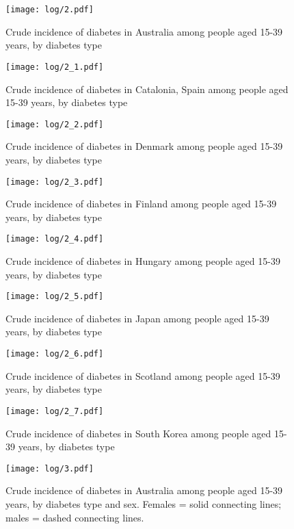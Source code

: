 \documentclass[11pt]{article}
\begin{document}
\color{Blue4}
\begin{figure}
    \centering
    \texttt{[image: log/2.pdf]}
    \caption{Crude incidence of diabetes in Australia among people aged 15-39 years, by diabetes type}
    \label{Australiacrude}
\end{figure}
\begin{figure}
    \centering
    \texttt{[image: log/2\_1.pdf]}
    \caption{Crude incidence of diabetes in Catalonia, Spain among people aged 15-39 years, by diabetes type}
    \label{Catalonia, Spaincrude}
\end{figure}
\begin{figure}
    \centering
    \texttt{[image: log/2\_2.pdf]}
    \caption{Crude incidence of diabetes in Denmark among people aged 15-39 years, by diabetes type}
    \label{Denmarkcrude}
\end{figure}
\begin{figure}
    \centering
    \texttt{[image: log/2\_3.pdf]}
    \caption{Crude incidence of diabetes in Finland among people aged 15-39 years, by diabetes type}
    \label{Finlandcrude}
\end{figure}
\begin{figure}
    \centering
    \texttt{[image: log/2\_4.pdf]}
    \caption{Crude incidence of diabetes in Hungary among people aged 15-39 years, by diabetes type}
    \label{Hungarycrude}
\end{figure}
\begin{figure}
    \centering
    \texttt{[image: log/2\_5.pdf]}
    \caption{Crude incidence of diabetes in Japan among people aged 15-39 years, by diabetes type}
    \label{Japancrude}
\end{figure}
\begin{figure}
    \centering
    \texttt{[image: log/2\_6.pdf]}
    \caption{Crude incidence of diabetes in Scotland among people aged 15-39 years, by diabetes type}
    \label{Scotlandcrude}
\end{figure}
\begin{figure}
    \centering
    \texttt{[image: log/2\_7.pdf]}
    \caption{Crude incidence of diabetes in South Korea among people aged 15-39 years, by diabetes type}
    \label{South Koreacrude}
\end{figure}
\begin{stlog}\end{stlog}
\begin{figure}
    \centering
    \texttt{[image: log/3.pdf]}
    \caption{Crude incidence of diabetes in Australia among people aged 15-39 years, by diabetes type and sex. Females = solid connecting lines; males = dashed connecting lines.}
    \label{Australiacrude}
\end{figure}
\end{document}
